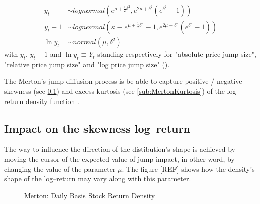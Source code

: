 \documentclass[12pt]{report}
\begin{document}
\begin{align}
  y_t  &\sim lognormal( e^{\mu + \frac{1}{2} \delta^2}, 
                        e^{2 \mu + \delta ^2} (e^{\delta^2} - 1)) 
  \label{eq:yt} \\
  y_t - 1 &\sim lognormal( \kappa \equiv e^{\mu + \frac{1}{2} \delta^2} - 1, 
                        e^{2 \mu + \delta ^2} (e^{\delta^2} - 1)) 
  \label{eq:ytminus1} \\
  \ln{y_t} &\sim normal(\mu, \delta^ 2)
  \label{eq:lny}
\end{align}
with $y_t$, $y_t - 1$ and $\ln{y_t} \equiv Y_t$ standing respectively for "absolute price jump size", "relative price jump size" and "log price jump size" (\citet{matsuda2004}).

 
The Merton's jump-diffusion process is be able to capture positive / negative skewness (see \cref{sub:MertonSkewness}) and excess kurtosis (see \cref{sub:MertonKurtosis}) of the log--return density function \citet{merton76}. 

\subsection{Impact on the skewness log--return}
\label{sub:MertonSkewness}

The way to influence the direction of the distibution's shape is achieved by moving the cursor of the expected value of jump impact, in other word, by changing the value of the parameter $\mu$. The figure [REF] shows how the density's shape of the log--return may vary along with this parameter.


\begin{figure}[!h]
\centering

\caption{Merton: Daily Basis Stock Return Density}
\label{plot:MertonReturnDensity}
\end{figure}

\end{document}
